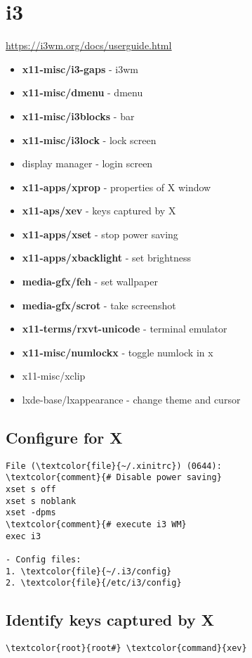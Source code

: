 \documentclass[10pt, a4paper, onecolumn, openany]{book}         %
\begin{document}
\section{i3}
\underline{\url{https://i3wm.org/docs/userguide.html}}\newline
\begin{itemize}
    \item \textbf{x11-misc/i3-gaps}     - i3wm
    \item \textbf{x11-misc/dmenu}       - dmenu
    \item \textbf{x11-misc/i3blocks}    - bar
    \item \textbf{x11-misc/i3lock}      - lock screen
    \item display manager - login screen
    \item \textbf{x11-apps/xprop}       - properties of X window
    \item \textbf{x11-aps/xev}          - keys captured by X
    \item \textbf{x11-apps/xset}        - stop power saving
    \item \textbf{x11-apps/xbacklight}  - set brightness
    \item \textbf{media-gfx/feh}        - set wallpaper
    \item \textbf{media-gfx/scrot}      - take screenshot
    \item \textbf{x11-terms/rxvt-unicode} - terminal emulator
    \item \textbf{x11-misc/numlockx} - toggle numlock in x
    \item x11-misc/xclip
    \item lxde-base/lxappearance - change theme and cursor
\end{itemize}
\subsection{Configure for X}
\begin{Verbatim}[commandchars=\\\{\}]
File (\textcolor{file}{~/.xinitrc}) (0644):
\textcolor{comment}{# Disable power saving}
xset s off
xset s noblank
xset -dpms
\textcolor{comment}{# execute i3 WM}
exec i3

- Config files:
1. \textcolor{file}{~/.i3/config}
2. \textcolor{file}{/etc/i3/config}
\end{Verbatim}

\subsection{Identify keys captured by X}
\begin{Verbatim}[commandchars=\\\{\}]
    \textcolor{root}{root#} \textcolor{command}{xev}
\end{Verbatim}
\end{document}
